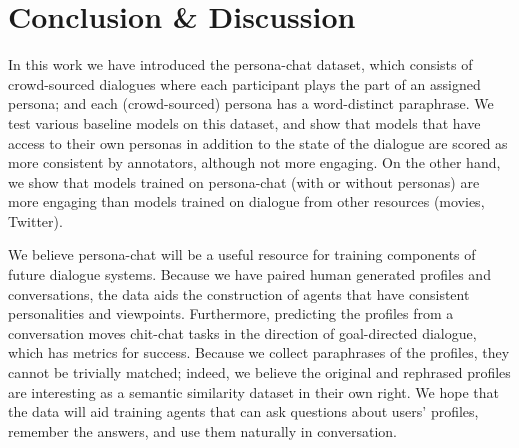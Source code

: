 \section{Conclusion \& Discussion}

In this work we have introduced the {\sc persona-chat} dataset, which consists of crowd-sourced dialogues where each participant plays the part of an assigned persona; and each (crowd-sourced) persona has a word-distinct paraphrase.  We test various baseline models on this dataset, and show that models that have access to their own personas in addition to the state of the dialogue are scored as more consistent by annotators, although not more engaging.   On the other hand, we show that models trained on {\sc persona-chat} (with or without personas) are more engaging than models trained on dialogue from other resources (movies, Twitter).  


We believe {\sc persona-chat} will be a useful resource for training components of future dialogue systems.  Because we have paired human generated profiles and conversations, the data aids the construction of agents that have consistent personalities and viewpoints.  Furthermore, predicting the profiles from a conversation moves chit-chat tasks in the direction of goal-directed dialogue, which has metrics for success. Because we collect paraphrases of the profiles, they cannot be trivially matched; indeed, we believe the original and rephrased profiles are interesting as a semantic similarity dataset in their own right.  We hope that the data will aid training agents that can ask questions about users' profiles, remember the answers, and use them naturally in conversation.  




